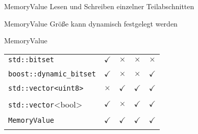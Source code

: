 \begin{slide}{MemoryValue}
{\large
    Lesen und Schreiben einzelner Teilabschnitten\\
}
\vspace{1cm}
\end{slide}

\begin{slide}{MemoryValue}
{\large
    Größe kann dynamisch festgelegt werden\\
}
\vspace{1cm}
\end{slide}

\begin{slide}{MemoryValue}
  \begin{tabular}{l|cccc}
    \texttt{std::bitset} & $\checkmark$ & $\times$ & $\times$ & $\times$ \\\\
    \texttt{boost::dynamic\_bitset} & $\checkmark$ & $\times$ & $\times$ & $\checkmark$ \\\\
    \texttt{std::vector\textless uint8\textgreater} & $\times$ & $\checkmark$ & $\checkmark$ & $\checkmark$ \\\\
    \texttt{std::vector}\textless bool\textgreater & $\checkmark$ & $\times$ & $\checkmark$ & $\checkmark$ \\\\
    \texttt{MemoryValue} & $\checkmark$ & $\checkmark$ & $\checkmark$ & $\checkmark$ \\\\
  \end{tabular}
\end{slide}

